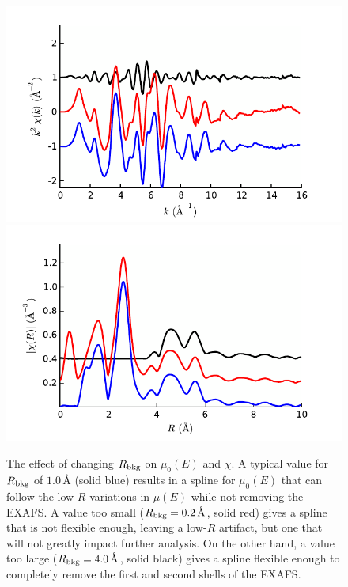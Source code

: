 \begin{figure}[tbh]
\begin{center}
        \includegraphics*[width=2.75truein]{../figs/rbkg_chi}\hspace{-0.25mm}%
        \includegraphics*[width=2.75truein]{../figs/rbkg_chir}
\end{center}
\caption{The effect of changing $R_{\rm bkg}$ on $\mu_0(E)$ and $\chi$.  A
  typical value for $R_{\rm bkg}$ of $1.0\,\text{\AA} $ (solid blue) results in
  a spline for $\mu_0(E)$ that can follow the low-$R$ variations in
  $\mu(E)$ while not removing the EXAFS.  A value too small ($R_{\rm bkg} =
  0.2\,\text{\AA} $, solid red) gives a spline that is not flexible enough,
  leaving a low-$R$ artifact, but one that will not greatly impact further
  analysis. On the other hand, a value too large ($R_{\rm bkg} =
  4.0\,\text{\AA} $, solid black) gives a spline flexible enough to completely
  remove the first and second shells of the EXAFS.}
  \label{Fig:RED:rbkg}
\end{figure}

